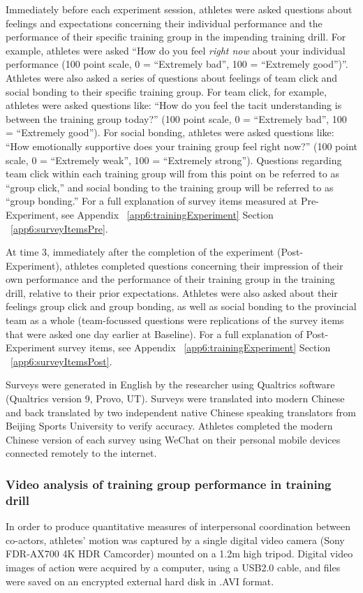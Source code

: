 Immediately before each experiment session, athletes were asked questions about feelings and expectations concerning their individual performance and the performance of their specific training group in the impending training drill.  For example,  athletes were asked ``How do you feel \textit{right now} about your individual performance (100 point scale, 0 = ``Extremely bad'', 100 = ``Extremely good'')''.  Athletes were also asked a series of questions about feelings of team click and social bonding to their specific training group. For team click, for example, athletes were asked questions like: ``How do you feel the tacit understanding is between the training group today?'' (100 point scale, 0 = ``Extremely bad'', 100 = ``Extremely good'').  For social bonding, athletes were asked questions like: ``How emotionally supportive does your training group feel right now?'' (100 point scale, 0 = ``Extremely weak'', 100 = ``Extremely strong'').  Questions regarding team click within each training group will from this point on be referred to as ``group click,'' and social bonding to the training group will be referred to as ``group bonding.'' For a full explanation of survey items measured at Pre-Experiment, see Appendix ~\ref{app6:trainingExperiment} Section ~\ref{app6:surveyItemsPre}.

At time 3, immediately after the completion of the experiment (Post-Experiment), athletes completed questions concerning their impression of their own performance and the performance of their training group in the training drill, relative to their prior expectations.  Athletes were also asked about their feelings group click and group bonding, as well as social bonding to the provincial team as a whole (team-focussed questions were replications of the survey items that were asked one day earlier at Baseline).  For a full explanation of Post-Experiment survey items, see Appendix ~\ref{app6:trainingExperiment} Section ~\ref{app6:surveyItemsPost}.

Surveys were generated in English by the researcher using Qualtrics software (Qualtrics version 9, Provo, UT). Surveys were translated into modern Chinese and back translated by two independent native Chinese speaking translators from Beijing Sports University to verify accuracy.  Athletes completed the modern Chinese version of each survey using WeChat on their personal mobile devices connected remotely to the internet.


\subsubsection{Video analysis of training group performance in training drill}
In order to produce quantitative measures of interpersonal coordination between co-actors, athletes’ motion was captured by a single digital video camera (Sony FDR-AX700 4K HDR Camcorder) mounted on a 1.2m high tripod. Digital video images of action were acquired by a computer, using a USB2.0 cable, and files were saved on an encrypted external hard disk in .AVI format.


